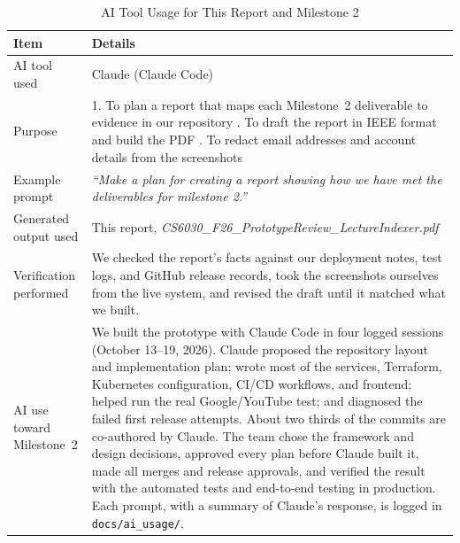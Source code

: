 \documentclass[conference]{IEEEtran}
\begin{document}
\begin{table}[h]
\caption{AI Tool Usage for This Report and Milestone 2}
\label{tab:ai}
\centering\small
\renewcommand{\arraystretch}{1.4}
\begin{tabularx}{\textwidth}{@{}p{3.6cm}X@{}}
\toprule
\textbf{Item} & \textbf{Details} \\
\midrule
AI tool used & Claude (Claude Code) \\
Purpose & 1. To plan a report that maps each Milestone~2 deliverable to evidence in our repository \newline
2. To draft the report in IEEE format and build the PDF \newline
3. To redact email addresses and account details from the screenshots \\
Example prompt & \textit{``Make a plan for creating a report showing how we have met the deliverables for milestone 2.''} \\
Generated output used & This report, \textit{CS6030\_F26\_PrototypeReview\_LectureIndexer.pdf} \\
Verification performed & We checked the report's facts against our deployment notes, test logs, and GitHub release records, took the screenshots ourselves from the live system, and revised the draft until it matched what we built. \\
AI use toward Milestone~2 & We built the prototype with Claude Code in four logged sessions (October 13--19, 2026). Claude proposed the repository layout and implementation plan; wrote most of the services, Terraform, Kubernetes configuration, CI/CD workflows, and frontend; helped run the real Google/YouTube test; and diagnosed the failed first release attempts. About two thirds of the commits are co-authored by Claude. The team chose the framework and design decisions, approved every plan before Claude built it, made all merges and release approvals, and verified the result with the automated tests and end-to-end testing in production. Each prompt, with a summary of Claude's response, is logged in \texttt{docs/ai\_usage/}. \\
\bottomrule
\end{tabularx}
\end{table}
\end{document}
